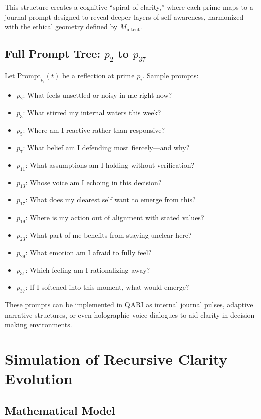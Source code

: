 \documentclass[12pt]{article}
\begin{document}
This structure creates a cognitive “spiral of clarity,” where each prime maps to a journal prompt designed to reveal deeper layers of self-awareness, harmonized with the ethical geometry defined by $M_{\text{intent}}$.

\subsection{Full Prompt Tree: $p_2$ to $p_{37}$}

Let $\text{Prompt}_{p_i}(t)$ be a reflection at prime $p_i$. Sample prompts:

\begin{itemize}
    \item $p_2$: What feels unsettled or noisy in me right now?
    \item $p_3$: What stirred my internal waters this week?
    \item $p_5$: Where am I reactive rather than responsive?
    \item $p_7$: What belief am I defending most fiercely—and why?
    \item $p_{11}$: What assumptions am I holding without verification?
    \item $p_{13}$: Whose voice am I echoing in this decision?
    \item $p_{17}$: What does my clearest self want to emerge from this?
    \item $p_{19}$: Where is my action out of alignment with stated values?
    \item $p_{23}$: What part of me benefits from staying unclear here?
    \item $p_{29}$: What emotion am I afraid to fully feel?
    \item $p_{31}$: Which feeling am I rationalizing away?
    \item $p_{37}$: If I softened into this moment, what would emerge?
\end{itemize}

These prompts can be implemented in QARI as internal journal pulses, adaptive narrative structures, or even holographic voice dialogues to aid clarity in decision-making environments.

\section{Simulation of Recursive Clarity Evolution}

\subsection{Mathematical Model}
\end{document}
